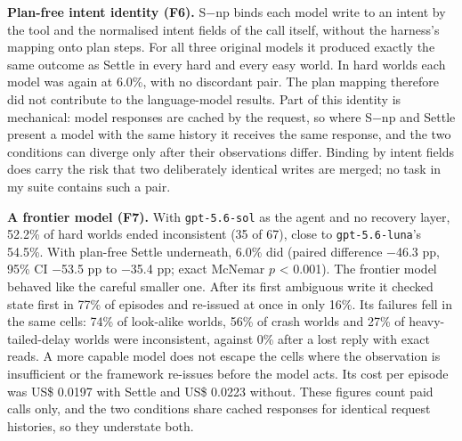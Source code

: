 \documentclass[
  10pt,
]{article}
\begin{document}
\textbf{Plan-free intent identity (F6).} S−np binds each model write to
an intent by the tool and the normalised intent fields of the call
itself, without the harness's mapping onto plan steps. For all three
original models it produced exactly the same outcome as Settle in every
hard and every easy world. In hard worlds each model was again at 6.0\%,
with no discordant pair. The plan mapping therefore did not contribute
to the language-model results. Part of this identity is mechanical:
model responses are cached by the request, so where S−np and Settle
present a model with the same history it receives the same response, and
the two conditions can diverge only after their observations differ.
Binding by intent fields does carry the risk that two deliberately
identical writes are merged; no task in my suite contains such a pair.

\textbf{A frontier model (F7).} With \texttt{gpt-5.6-sol} as the agent
and no recovery layer, 52.2\% of hard worlds ended inconsistent (35 of
67), close to \texttt{gpt-5.6-luna}'s 54.5\%. With plan-free Settle
underneath, 6.0\% did (paired difference −46.3 pp, 95\% CI −53.5 pp to
−35.4 pp; exact McNemar \(p\) \textless{} 0.001). The frontier model
behaved like the careful smaller one. After its first ambiguous write it
checked state first in 77\% of episodes and re-issued at once in only
16\%. Its failures fell in the same cells: 74\% of look-alike worlds,
56\% of crash worlds and 27\% of heavy-tailed-delay worlds were
inconsistent, against 0\% after a lost reply with exact reads. A more
capable model does not escape the cells where the observation is
insufficient or the framework re-issues before the model acts. Its cost
per episode was US\$ 0.0197 with Settle and US\$ 0.0223 without. These
figures count paid calls only, and the two conditions share cached
responses for identical request histories, so they understate both.
\end{document}
